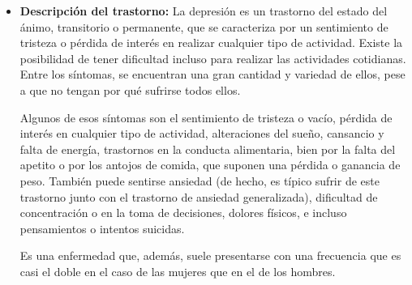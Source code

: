 \documentclass[12pt, a4paper,twoside,titlepage]{book}
\begin{document}
\begin{itemize}
    \item {\textbf{Descripción del trastorno:}
     La depresión es un trastorno del estado del ánimo, transitorio o permanente, que se caracteriza por un sentimiento de tristeza o pérdida de interés en realizar cualquier tipo de actividad. Existe la posibilidad de tener dificultad incluso para realizar las actividades cotidianas. Entre los síntomas, se encuentran una gran cantidad y variedad de ellos, pese a que no tengan por qué sufrirse todos ellos. 
     
     Algunos de esos síntomas son el sentimiento de tristeza o vacío, pérdida de interés en cualquier tipo de actividad, alteraciones del sueño, cansancio y falta de energía, trastornos en la conducta alimentaria, bien por la falta del apetito o por los antojos de comida, que suponen una pérdida o ganancia de peso. También puede sentirse ansiedad (de hecho, es típico sufrir de este trastorno junto con el trastorno de ansiedad generalizada), dificultad de concentración o en la toma de decisiones, dolores físicos, e incluso pensamientos o intentos suicidas.
     
     Es una enfermedad que, además, suele presentarse con una frecuencia que es casi el doble en el caso de las mujeres que en el de los hombres. 
     
}
\end{itemize}
\end{document}

